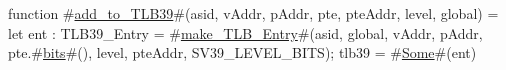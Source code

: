function #\hyperref[sailRISCVzaddzytozyTLB39]{add\_to\_TLB39}#(asid, vAddr, pAddr, pte, pteAddr, level, global) = {
  let ent : TLB39_Entry = #\hyperref[sailRISCVzmakezyTLBzyEntry]{make\_TLB\_Entry}#(asid, global, vAddr, pAddr, pte.#\hyperref[sailRISCVzbits]{bits}#(), level, pteAddr, SV39_LEVEL_BITS);
  tlb39 = #\hyperref[sailRISCVzSome]{Some}#(ent)
}
